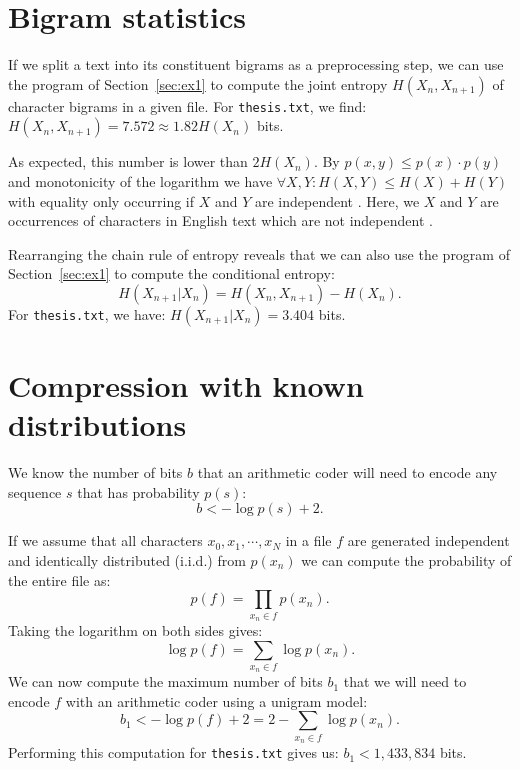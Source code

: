 \documentclass[10pt,a4paper,oneside,onecolumn]{article}
\makeatletter
\newcommand*{\thesisTXT}{{\tt thesis.txt}\xspace}
\newcommand*{\iid}{i.i.d.\@}
\makeatother
\begin{document}
\section{Bigram statistics}\label{sec:ex2}

If we split a text into its constituent bigrams as a preprocessing step, we can
use the program of Section~\ref{sec:ex1} to compute the joint entropy $H(X_n,
X_{n+1})$ of character bigrams in a given file. For \thesisTXT, we
find: $H(X_n, X_{n+1}) = 7.572 \approx 1.82H(X_n)$ bits.\footnotemark
{}

As expected, this number is lower than $2H(X_n)$. By $p(x,y) \le p(x) \cdot
p(y)$ and monotonicity of the logarithm we have $\forall X,Y: H(X, Y) \le H(X) +
H(Y)$ with equality only occurring if $X$ and $Y$ are independent
\cite[p.~138]{mackay}. Here, we $X$ and $Y$ are occurrences of characters in
English text which are not independent \cite[p.~22-24]{mackay}.

Rearranging the chain rule of entropy \cite[p.~139]{mackay} reveals that we can
also use the program of Section~\ref{sec:ex1} to compute the conditional
entropy:
\begin{equation}
    H(X_{n+1} | X_n) = H(X_n, X_{n+1}) - H(X_n).
\end{equation}
For \thesisTXT, we have: $H(X_{n+1} | X_n) = 3.404$ bits.


\section{Compression with known distributions}\label{sec:ex3}

We know \cite[p.~21]{it4} the number of bits $b$ that an arithmetic coder
will need to encode any sequence $s$ that has probability $p(s)$:
\begin{equation}
    b < -\log p(s) + 2.
\end{equation}

If we assume that all characters $x_0, x_1, \cdots, x_N$ in a file $f$ are
generated independent and identically distributed (\iid) from $p(x_n)$ we can
compute the probability of the entire file as:
\begin{equation}
    p(f) = \prod\limits_{x_n \in f} p(x_n).
\end{equation}
Taking the logarithm on both sides gives:
\begin{equation}\label{eq:unigram-logprob}
    \log p(f) = \sum\limits_{x_n \in f} \log p(x_n).
\end{equation}
We can now compute the maximum number of bits $b_1$ that we will need to encode
$f$ with an arithmetic coder using a unigram model:
\begin{equation}\label{eq:unigram-nbits}
    b_1 < -\log p(f) + 2 = 2 - \sum\limits_{x_n \in f} \log p(x_n).
\end{equation}
Performing this computation for \thesisTXT gives us: $b_1 < 1,433,834$ bits.
\end{document}
